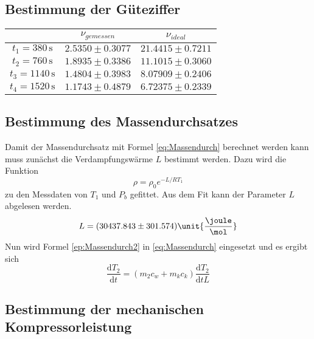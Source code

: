 \subsection{Bestimmung der Güteziffer}

\begin{table}[H]
  \centering
  \label{tab:gueteziffer}
  \begin{tabular}{S S S[table-format=2.4]}
    \toprule
    & {$ν_{gemessen}$} & {$ν_{ideal}$} \\
    \midrule
    {$t_1 = 380  \, \unit{\second}$} & {$2.5350 \pm 0.3077$} & {$21.4415 \pm 0.7211$} \\
    {$t_2 = 760  \, \unit{\second}$} & {$1.8935 \pm 0.3386$} & {$11.1015 \pm 0.3060$} \\
    {$t_3 = 1140 \, \unit{\second}$} & {$1.4804 \pm 0.3983$} & {$8.07909 \pm 0.2406$} \\
    {$t_4 = 1520 \, \unit{\second}$} & {$1.1743 \pm 0.4879$} & {$6.72375 \pm 0.2339$} \\
    \bottomrule
  \end{tabular}
\end{table}

\subsection{Bestimmung des Massendurchsatzes}

Damit der Massendurchsatz mit Formel \eqref{eq:Massendurch} berechnet werden kann muss zunächst die Verdampfungswärme $L$ bestimmt werden.
Dazu wird die Funktion 
\begin{equation}
  \rho = \rho_0 e^{-L/R T_1}
\end{equation}
zu den Messdaten von $T_1$ und $P_b$ gefittet. Aus dem Fit kann der Parameter $L$ abgelesen werden.\\

\begin{equation}
  L = (30437.843 \pm 301.574) \unit{\dfrac{\joule}{\mol}}
\end{equation}
Nun wird Formel \eqref{ep:Massendurch2} in \eqref{eq:Massendurch} eingesetzt und es ergibt sich
\begin{equation}
  \dfrac{\text{d}T_2}{\text{d}t} = (m_2c_w +m_kc_k)\dfrac{\text{d}T_2}{\text{d}tL}
\end{equation}


\subsection{Bestimmung der mechanischen Kompressorleistung}

